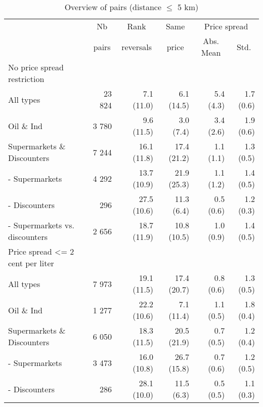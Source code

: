 \documentclass[english]{article}
\begin{document}
\begin{table}[htb!] %
\caption{Overview of pairs (distance $\le$ 5 km)}
\label{tab:stats_pairs_5km}
\begin{threeparttable}
\begin{tabular}{lrrrrr}
    \toprule
    \toprule
          & \multicolumn{1}{c}{Nb} & \multicolumn{1}{c}{Rank} & \multicolumn{1}{c}{Same} & \multicolumn{2}{c}{Price spread} \\
          & \multicolumn{1}{c}{pairs} & \multicolumn{1}{c}{reversals} & \multicolumn{1}{c}{price} & \multicolumn{1}{c}{Abs. Mean} & \multicolumn{1}{c}{Std.} \\
    \midrule
    No price spread restriction &       &       &       &       &  \\
    All types & 23 824 & 7.1 (11.0) & 6.1 (14.5) & 5.4 (4.3) & 1.7 (0.6) \\
    Oil \& Ind & 3 780 & 9.6 (11.5) & 3.0 (7.4) & 3.4 (2.6) & 1.9 (0.6) \\
    Supermarkets \& Discounters & 7 244 & 16.1 (11.8) & 17.4 (21.2) & 1.1 (1.1) & 1.3 (0.5) \\
    \hspace*{4mm} - Supermarkets & 4 292 & 13.7 (10.9) & 21.9 (25.3) & 1.1 (1.2) & 1.4 (0.5) \\
    \hspace*{4mm} - Discounters & 296   & 27.5 (10.6) & 11.3 \phantom{0}(6.4) & 0.5 (0.6) & 1.2 (0.3) \\
    \hspace*{4mm} - Supermarkets vs. discounters & 2 656 & 18.7 (11.9) & 10.8 (10.5) & 1.0 (0.9) & 1.4 (0.5) \\
    \midrule
    Price spread <= 2 cent per liter &       &       &       &       &  \\
    All types & 7 973 & 19.1 (11.5) & 17.4 (20.7) & 0.8 (0.6) & 1.3 (0.5) \\
    Oil \& Ind & 1 277 & 22.2 (10.6) & 7.1 (11.4) & 1.1 (0.5) & 1.8 (0.4) \\
    Supermarkets \& Discounters & 6 050 & 18.3 (11.5) & 20.5 (21.9) & 0.7 (0.5) & 1.2 (0.4) \\
    \hspace*{4mm} - Supermarkets & 3 473 & 16.0 (10.8) & 26.7 (15.8) & 0.7 (0.6) & 1.2 (0.5) \\
    \hspace*{4mm} - Discounters & 286   & 28.1 (10.0) & 11.5 \phantom{0}(6.3) & 0.5 (0.5) & 1.1 (0.3) \\

\end{tabular}
\end{threeparttable}
\end{table}
\end{document}
